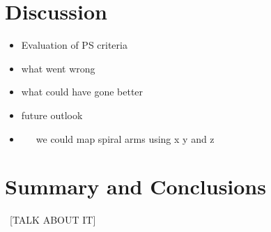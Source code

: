 \documentclass[aps,prb,twocolumn,superscriptaddress]{revtex4-1}
\begin{document}
\section{Discussion}
\begin{itemize}
	\item{} Evaluation of PS criteria
	\item{} what went wrong
	\item{} what could have gone better
	\item{} future outlook
	\item{}~~~we could map spiral arms using x y and z
\end{itemize}

	



\section{Summary and Conclusions}
~[TALK ABOUT IT]
\end{document}
